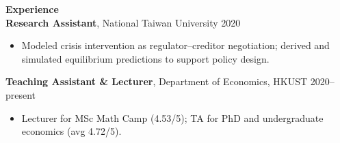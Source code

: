 \documentclass[11pt,letterpaper]{article}
\begin{document}
{\large \textbf{Experience}}\\[-0.5pt]
\textbf{Research Assistant}, National Taiwan University \hfill 2020\\
\vspace{-6pt}
\begin{itemize}
  \item Modeled crisis intervention as regulator--creditor negotiation; derived and simulated equilibrium predictions to support policy design.
\end{itemize}
\textbf{Teaching Assistant \& Lecturer}, Department of Economics, HKUST \hfill 2020--present\\
\vspace{-6pt}
\begin{itemize}
  \item Lecturer for MSc Math Camp (4.53/5); TA for PhD and undergraduate economics (avg 4.72/5).
\end{itemize}

\vspace{16pt}
\end{document}
